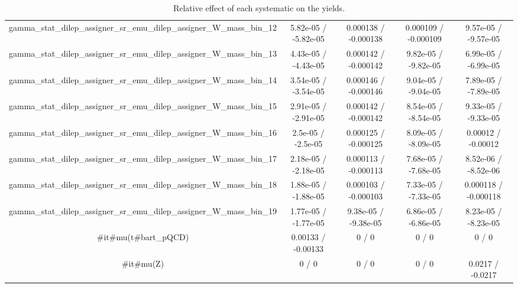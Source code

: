 \documentclass[10pt]{article}
\begin{document}
\begin{table}[htbp]
\begin{center}
\begin{tabular}{|c|c|c|c|c|}
  gamma_stat_dilep_assigner_sr_emu_dilep_assigner_W_mass_bin_12 & 5.82e-05 / -5.82e-05 & 0.000138 / -0.000138 & 0.000109 / -0.000109 & 9.57e-05 / -9.57e-05 \\ 
  gamma_stat_dilep_assigner_sr_emu_dilep_assigner_W_mass_bin_13 & 4.43e-05 / -4.43e-05 & 0.000142 / -0.000142 & 9.82e-05 / -9.82e-05 & 6.99e-05 / -6.99e-05 \\ 
  gamma_stat_dilep_assigner_sr_emu_dilep_assigner_W_mass_bin_14 & 3.54e-05 / -3.54e-05 & 0.000146 / -0.000146 & 9.04e-05 / -9.04e-05 & 7.89e-05 / -7.89e-05 \\ 
  gamma_stat_dilep_assigner_sr_emu_dilep_assigner_W_mass_bin_15 & 2.91e-05 / -2.91e-05 & 0.000142 / -0.000142 & 8.54e-05 / -8.54e-05 & 9.33e-05 / -9.33e-05 \\ 
  gamma_stat_dilep_assigner_sr_emu_dilep_assigner_W_mass_bin_16 & 2.5e-05 / -2.5e-05 & 0.000125 / -0.000125 & 8.09e-05 / -8.09e-05 & 0.00012 / -0.00012 \\ 
  gamma_stat_dilep_assigner_sr_emu_dilep_assigner_W_mass_bin_17 & 2.18e-05 / -2.18e-05 & 0.000113 / -0.000113 & 7.68e-05 / -7.68e-05 & 8.52e-06 / -8.52e-06 \\ 
  gamma_stat_dilep_assigner_sr_emu_dilep_assigner_W_mass_bin_18 & 1.88e-05 / -1.88e-05 & 0.000103 / -0.000103 & 7.33e-05 / -7.33e-05 & 0.000118 / -0.000118 \\ 
  gamma_stat_dilep_assigner_sr_emu_dilep_assigner_W_mass_bin_19 & 1.77e-05 / -1.77e-05 & 9.38e-05 / -9.38e-05 & 6.86e-05 / -6.86e-05 & 8.23e-05 / -8.23e-05 \\ 
  #it{#mu}(t#bar{t}_{pQCD}) & 0.00133 / -0.00133 & 0 / 0 & 0 / 0 & 0 / 0 \\ 
  #it{#mu}(Z) & 0 / 0 & 0 / 0 & 0 / 0 & 0.0217 / -0.0217 \\ 
\hline 
\end{tabular} 
\caption{Relative effect of each systematic on the yields.} 
\end{center} 
\end{table} 
\end{document}
